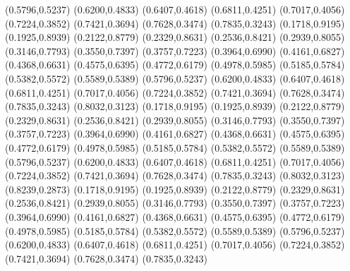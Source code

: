 \PST@Diamond(0.5796,0.5237)
\PST@Diamond(0.6200,0.4833)
\PST@Diamond(0.6407,0.4618)
\PST@Diamond(0.6811,0.4251)
\PST@Diamond(0.7017,0.4056)
\PST@Diamond(0.7224,0.3852)
\PST@Diamond(0.7421,0.3694)
\PST@Diamond(0.7628,0.3474)
\PST@Diamond(0.7835,0.3243)
\PST@Diamond(0.1718,0.9195)
\PST@Diamond(0.1925,0.8939)
\PST@Diamond(0.2122,0.8779)
\PST@Diamond(0.2329,0.8631)
\PST@Diamond(0.2536,0.8421)
\PST@Diamond(0.2939,0.8055)
\PST@Diamond(0.3146,0.7793)
\PST@Diamond(0.3550,0.7397)
\PST@Diamond(0.3757,0.7223)
\PST@Diamond(0.3964,0.6990)
\PST@Diamond(0.4161,0.6827)
\PST@Diamond(0.4368,0.6631)
\PST@Diamond(0.4575,0.6395)
\PST@Diamond(0.4772,0.6179)
\PST@Diamond(0.4978,0.5985)
\PST@Diamond(0.5185,0.5784)
\PST@Diamond(0.5382,0.5572)
\PST@Diamond(0.5589,0.5389)
\PST@Diamond(0.5796,0.5237)
\PST@Diamond(0.6200,0.4833)
\PST@Diamond(0.6407,0.4618)
\PST@Diamond(0.6811,0.4251)
\PST@Diamond(0.7017,0.4056)
\PST@Diamond(0.7224,0.3852)
\PST@Diamond(0.7421,0.3694)
\PST@Diamond(0.7628,0.3474)
\PST@Diamond(0.7835,0.3243)
\PST@Diamond(0.8032,0.3123)
\PST@Diamond(0.1718,0.9195)
\PST@Diamond(0.1925,0.8939)
\PST@Diamond(0.2122,0.8779)
\PST@Diamond(0.2329,0.8631)
\PST@Diamond(0.2536,0.8421)
\PST@Diamond(0.2939,0.8055)
\PST@Diamond(0.3146,0.7793)
\PST@Diamond(0.3550,0.7397)
\PST@Diamond(0.3757,0.7223)
\PST@Diamond(0.3964,0.6990)
\PST@Diamond(0.4161,0.6827)
\PST@Diamond(0.4368,0.6631)
\PST@Diamond(0.4575,0.6395)
\PST@Diamond(0.4772,0.6179)
\PST@Diamond(0.4978,0.5985)
\PST@Diamond(0.5185,0.5784)
\PST@Diamond(0.5382,0.5572)
\PST@Diamond(0.5589,0.5389)
\PST@Diamond(0.5796,0.5237)
\PST@Diamond(0.6200,0.4833)
\PST@Diamond(0.6407,0.4618)
\PST@Diamond(0.6811,0.4251)
\PST@Diamond(0.7017,0.4056)
\PST@Diamond(0.7224,0.3852)
\PST@Diamond(0.7421,0.3694)
\PST@Diamond(0.7628,0.3474)
\PST@Diamond(0.7835,0.3243)
\PST@Diamond(0.8032,0.3123)
\PST@Diamond(0.8239,0.2873)
\PST@Diamond(0.1718,0.9195)
\PST@Diamond(0.1925,0.8939)
\PST@Diamond(0.2122,0.8779)
\PST@Diamond(0.2329,0.8631)
\PST@Diamond(0.2536,0.8421)
\PST@Diamond(0.2939,0.8055)
\PST@Diamond(0.3146,0.7793)
\PST@Diamond(0.3550,0.7397)
\PST@Diamond(0.3757,0.7223)
\PST@Diamond(0.3964,0.6990)
\PST@Diamond(0.4161,0.6827)
\PST@Diamond(0.4368,0.6631)
\PST@Diamond(0.4575,0.6395)
\PST@Diamond(0.4772,0.6179)
\PST@Diamond(0.4978,0.5985)
\PST@Diamond(0.5185,0.5784)
\PST@Diamond(0.5382,0.5572)
\PST@Diamond(0.5589,0.5389)
\PST@Diamond(0.5796,0.5237)
\PST@Diamond(0.6200,0.4833)
\PST@Diamond(0.6407,0.4618)
\PST@Diamond(0.6811,0.4251)
\PST@Diamond(0.7017,0.4056)
\PST@Diamond(0.7224,0.3852)
\PST@Diamond(0.7421,0.3694)
\PST@Diamond(0.7628,0.3474)
\PST@Diamond(0.7835,0.3243)
